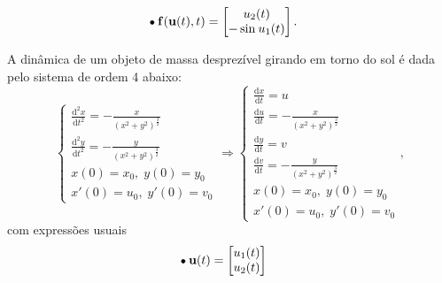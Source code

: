 \documentclass[../differential_methods.tex]{subfiles}
\begin{document}
\begin{example}[Pêndulo]
\begin{align*}
		 & \tikz[baseline=-0.5ex]\draw[black, fill=black, radius=1.5pt](0, 0)circle;\; \mathbf{f}(\mathbf{u}(t), t) = \begin{bmatrix}
			                                                                                                              u_2(t) \\
			                                                                                                              -\sin^{}{u_{1}(t)}
		                                                                                                              \end{bmatrix}.
	\end{align*}
\end{example}
\begin{example}[Gravitação]
	A dinâmica de um objeto de massa desprezível girando em torno do sol é dada pelo sistema de ordem 4 abaixo:
	\[
		\left\{\begin{array}{ll}
			\frac{\mathrm{d}^{2}x}{\mathrm{d}t^{2}} =-\frac{x}{(x^{2}+y^{2})^{\frac{3}{2}}} \\
			\frac{\mathrm{d}^{2}y}{\mathrm{d}t^{2}}=-\frac{y}{(x^{2}+y^{2})^{\frac{3}{2}}}  \\
			x(0)=x_{0},\; y(0)=y_{0}                                                        \\
			x'(0)=u_{0},\; y'(0)=v_{0}
		\end{array}\right. \Rightarrow \left\{\begin{array}{ll}
			\frac{\mathrm{d}x}{\mathrm{d}t}=u                                       \\
			\frac{\mathrm{d}u}{\mathrm{d}t}=- \frac{x}{(x^{2}+y^{2})^{\frac{3}{2}}} \\
			\frac{\mathrm{d}y}{\mathrm{d}t}=v                                       \\
			\frac{\mathrm{d}v}{\mathrm{d}t}=-\frac{y}{(x^{2}+y^{2})^{\frac{3}{2}}}  \\
			x(0)=x_{0},\; y(0)=y_{0}                                                \\
			x'(0)=u_{0},\; y'(0)=v_{0}
		\end{array}\right.,
	\]
	com expressões usuais
	\begin{align*}
		 & \tikz[baseline=-0.5ex]\draw[black, fill=black, radius=1.5pt](0, 0)circle;\; \mathbf{u}(t)=\begin{bmatrix}
			                                                                                             u_1(t)   \\
			                                                                                             u_2(t)   \\

\end{bmatrix}
\end{align*}
\end{example}
\end{document}
